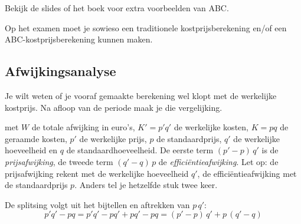 \documentclass[a4paper,11pt]{article}
\begin{document}
Bekijk de slides of het boek voor extra voorbeelden van ABC.

\begin{examenbox}
    Op het examen moet je sowieso een traditionele kostprijsberekening
    en/of een ABC-kostprijsberekening kunnen maken.
\end{examenbox}

\subsection{Afwijkingsanalyse}
Je wilt weten of je vooraf gemaakte berekening wel klopt met de werkelijke kostprijs.
Na afloop van de periode maak je die vergelijking.

{met $W$ de totale afwijking in euro's, $K' = p'q'$ de werkelijke kosten, $K = pq$ de geraamde kosten,
    $p'$ de werkelijke prijs, $p$ de standaardprijs, $q'$ de werkelijke hoeveelheid en $q$ de standaardhoeveelheid.
    De eerste term $(p'-p)\,q'$ is de \emph{prijsafwijking}, de tweede term $(q'-q)\,p$ de
    \emph{efficiëntieafwijking}. Let op: de prijsafwijking rekent met de werkelijke hoeveelheid $q'$,
    de efficiëntieafwijking met de standaardprijs $p$. Anders tel je hetzelfde stuk twee keer.}

De splitsing volgt uit het bijtellen en aftrekken van $p\,q'$:
$$p'q' - pq = p'q' - pq' + pq' - pq = (p'-p)\,q' + p\,(q'-q)$$
\end{document}
